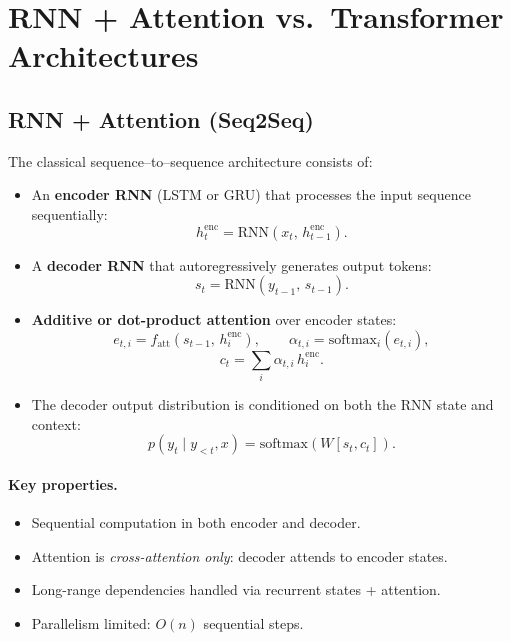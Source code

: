 \documentclass[12pt]{article}
\begin{document}
\psetheader %

\section{RNN + Attention vs.\ Transformer Architectures}

\subsection{RNN + Attention (Seq2Seq)}
The classical sequence--to--sequence architecture consists of:
\begin{itemize}
		\item An \textbf{encoder RNN} (LSTM or GRU) that processes the input sequence sequentially:
    \[
						h_t^{\text{enc}} = \mathrm{RNN}(x_t,\, h_{t-1}^{\text{enc}}).
    \]
		\item A \textbf{decoder RNN} that autoregressively generates output tokens:
    \[
						s_t = \mathrm{RNN}(y_{t-1},\, s_{t-1}).
    \]
		\item \textbf{Additive or dot-product attention} over encoder states:
    \[
						e_{t,i} = f_{\mathrm{att}}(s_{t-1},\, h_i^{\text{enc}}), \qquad
						\alpha_{t,i} = \mathrm{softmax}_i(e_{t,i}),
    \]
    \[
						c_t = \sum_{i} \alpha_{t,i}\, h_i^{\text{enc}}.
    \]
		\item The decoder output distribution is conditioned on both the RNN state and context:
    \[
						p(y_t \mid y_{<t}, x) = \mathrm{softmax}(W[s_t, c_t]).
    \]
\end{itemize}

\paragraph{Key properties.}
\begin{itemize}
		\item Sequential computation in both encoder and decoder.
		\item Attention is \emph{cross-attention only}: decoder attends to encoder states.
		\item Long-range dependencies handled via recurrent states + attention.
		\item Parallelism limited: $O(n)$ sequential steps.
\end{itemize}
\end{document}

